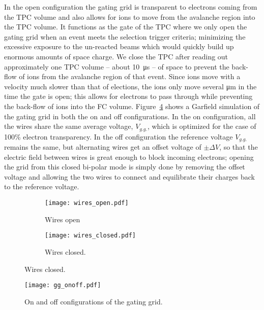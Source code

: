 In the open configuration the gating grid is transparent to electrons coming from the TPC volume and also allows for ions to move from the avalanche region into the TPC volume. It functions as the gate of the TPC where we only open the gating grid when an event meets the selection trigger criteria; minimizing the excessive exposure to the un-reacted beams which would quickly build up enormous amounts of space charge. We close the TPC after reading out approximately one TPC volume -- about \SI{10}{\micro\second}  -- of space to prevent the back-flow of ions from the avalanche region of that event. Since ions move with a velocity much slower than that of elections, the ions only move several \si{\micro\metre} in the time the gate is open; this allows for electrons to pass through while preventing the back-flow of ions into the FC volume. Figure~\ref{fig:gg_onoff} shows a Garfield simulation of the gating grid in both the on and off configurations. In the on configuration, all the wires share the same average voltage, $V_{g.g.}$, which is optimized for the case of 100\% electron transparency. In the off configuration the reference voltage $V_{g.g.}$ remains the same, but alternating wires get an offset voltage of $\pm \Delta V$, so that the electric field between wires is great enough to block incoming electrons; opening the grid from this closed bi-polar mode is simply done by removing the offset voltage and allowing the two wires to connect and equilibrate their charges back to the reference voltage. 


\begin{figure}[!htb]
    \centering
    \begin{subfigure}[t]{0.49\textwidth}
        \centering
        \texttt{[image: wires\_open.pdf]} 
        \caption{Wires open} \label{fig:wires_open}
    \end{subfigure}
    \hfill
    \begin{subfigure}[t]{0.42\textwidth}
        \centering
        \texttt{[image: wires\_closed.pdf]} 
        \caption{Wires closed.} \label{fig:wires_closed}
    \end{subfigure}
\label{fig:wires}
\end{figure}



\begin{figure}[!htb]
\centering
\texttt{[image: gg\_onoff.pdf]}
\caption{On and off configurations of the gating grid.}
\label{fig:gg_onoff}
\end{figure}

